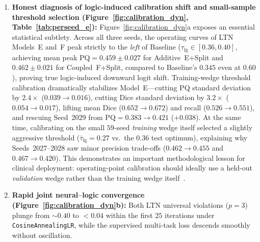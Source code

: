 \documentclass[10pt,a4paper]{article}
\renewcommand{\_}{\origunderscore\allowbreak}
\begin{document}
\begin{enumerate}
\begin{itemize}
    \end{itemize}
    \item \textbf{Honest diagnosis of logic-induced calibration shift and small-sample threshold selection (Figure~\ref{fig:calibration_dyn}, Table~\ref{tab:perseed_e}):} Figure~\ref{fig:calibration_dyn}a exposes an essential statistical subtlety. Across all three seeds, the operating curves of LTN Models~E and~F peak strictly to the \emph{left} of Baseline ($\tau_{\text{fg}} \in [0.36, 0.40]$, achieving mean peak $\text{PQ} = 0.459 \pm 0.027$ for Additive~E+Split and $0.462 \pm 0.021$ for Coupled~F+Split, compared to Baseline's $0.345$ even at $0.60$), proving true logic-induced downward logit shift. Training-wedge threshold calibration dramatically stabilizes Model~E---cutting $\text{PQ}$ standard deviation by $2.4\times$ ($0.039 \to 0.016$), cutting $\text{Dice}$ standard deviation by $3.2\times$ ($0.054 \to 0.017$), lifting mean $\text{Dice}$ ($0.652 \to 0.672$) and recall ($0.526 \to 0.551$), and rescuing Seed~2029 from $\text{PQ} = 0.383 \to 0.421$ ($+0.038$). At the same time, calibrating on the small $59$-seed \emph{training} wedge itself selected a slightly aggressive threshold ($\bar{\tau}_{\text{fg}} = 0.27$ vs.\ the $0.36$ test optimum), explaining why Seeds~2027--2028 saw minor precision trade-offs ($0.462 \to 0.455$ and $0.467 \to 0.420$). This demonstrates an important methodological lesson for clinical deployment: operating-point calibration should ideally use a held-out \emph{validation} wedge rather than the training wedge itself~\cite{collins2024tripodai}.
    \item \textbf{Rapid joint neural--logic convergence (Figure~\ref{fig:calibration_dyn}b):} Both LTN universal violations ($p=3$) plunge from $\sim 0.40$ to $<0.04$ within the first $25$ iterations under \texttt{CosineAnnealingLR}, while the supervised multi-task loss descends smoothly without oscillation.
\end{enumerate}
\end{document}
